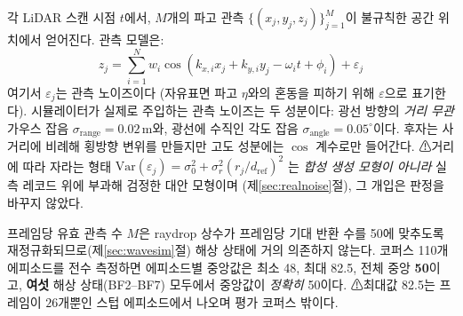 \documentclass[11pt]{report}
\numberwithin{equation}{chapter}
\numberwithin{figure}{chapter}
\numberwithin{table}{chapter}
\begin{document}
각 LiDAR 스캔 시점 $t$에서, $M$개의 파고 관측
$\{(x_j, y_j, z_j)\}_{j=1}^{M}$이 불규칙한 공간 위치에서 얻어진다.
관측 모델은:
\begin{equation}
  z_j = \sum_{i=1}^{N} w_i \cos(k_{x,i} x_j + k_{y,i} y_j - \omega_i t + \phi_i) + \varepsilon_j
\end{equation}
여기서 $\varepsilon_j$는 관측 노이즈이다
(자유표면 파고 $\eta$와의 혼동을 피하기 위해 $\varepsilon$으로 표기한다).
시뮬레이터가 실제로 주입하는 관측 노이즈는 두 성분이다: 광선 방향의
\emph{거리 무관} 가우스 잡음 $\sigma_{\text{range}} = 0.02$\,m와, 광선에 수직인
각도 잡음 $\sigma_{\text{angle}} = 0.05^\circ$이다. 후자는 사거리에 비례해 횡방향
변위를 만들지만 고도 성분에는 $\cos$ 계수로만 들어간다.
⚠거리에 따라 자라는 형태
$\mathrm{Var}(\varepsilon_j) = \sigma_0^2 + \sigma_r^2 (r_j/d_{\text{ref}})^2$
는 \emph{합성 생성 모형이 아니라} 실측 레코드 위에 부과해 검정한 대안 모형이며
(제\ref{sec:realnoise}절), 그 개입은 판정을 바꾸지 않았다.

프레임당 유효 관측 수 $M$은 raydrop 상수가 프레임당 기대 반환 수를 50에 맞추도록
재정규화되므로(제\ref{sec:wavesim}절) 해상 상태에 거의 의존하지 않는다. 코퍼스 110개
에피소드를 전수 측정하면 에피소드별 중앙값은 최소 48, 최대 82.5, 전체 중앙
\textbf{50}이고, \textbf{여섯} 해상 상태(BF2--BF7) 모두에서 중앙값이 \emph{정확히}
50이다.
⚠최대값 82.5는 프레임이 $26$개뿐인 스텁 에피소드에서 나오며 평가 코퍼스 밖이다.
\end{document}
